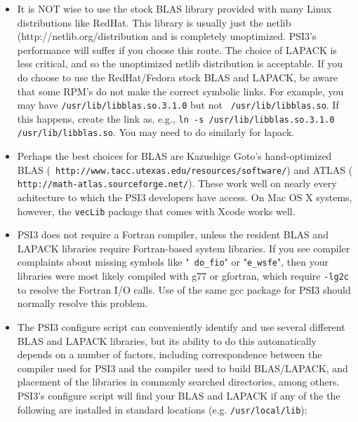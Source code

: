 \documentclass[12pt]{article}
\begin{document}
\begin{itemize}
\item It is NOT wise to use the stock BLAS library provided with many
  Linux distributions like RedHat.  This library is usually just the
  netlib ({http://netlib.org/}distribution and is completely
  unoptimized.  PSI3's performance will suffer if you choose this
  route.  The choice of LAPACK is less critical, and so the
  unoptimized netlib distribution is acceptable.  If you do choose to
  use the RedHat/Fedora stock BLAS and LAPACK, be aware that some
  RPM's do not make the correct symbolic links.  For example, you may
  have {\tt /usr/lib/libblas.so.3.1.0} but not {\tt
    /usr/lib/libblas.so}.  If this happens, create the link as, e.g.,
  {\tt ln -s /usr/lib/libblas.so.3.1.0 /usr/lib/libblas.so}.  You may
  need to do similarly for lapack.

\item Perhaps the best choices for BLAS are Kazushige Goto's
  hand-optimized BLAS ({\tt
    http://www.tacc.utexas.edu/resources/software/}) and ATLAS ({\tt
    http://math-atlas.sourceforge.net/}).  These work well on nearly
  every achitecture to which the PSI3 developers have access.  On Mac
  OS X systems, however, the {\tt vecLib} package that comes with
  Xcode works well.

\item PSI3 does not require a Fortran compiler, unless the resident
  BLAS and LAPACK libraries require Fortran-based system libraries.
  If you see compiler complaints about missing symbols like "{\tt
    do\_fio}" or "{\tt e\_wsfe}", then your libraries were most likely
  compiled with g77 or gfortran, which require {\tt -lg2c} to resolve
  the Fortran I/O calls.  Use of the same gcc package for PSI3 should
  normally resolve this problem.

\item The PSI3 configure script can conveniently identify and use
  several different BLAS and LAPACK libraries, but its ability to do
  this automatically depends on a number of factors, including
  correspondence between the compiler used for PSI3 and the compiler
  used to build BLAS/LAPACK, and placement of the libraries in
  commonly searched directories, among others.  PSI3's configure
  script will find your BLAS and LAPACK if any of the the following
  are installed in standard locations (e.g. {\tt /usr/local/lib}):


\end{itemize}
\end{document}

